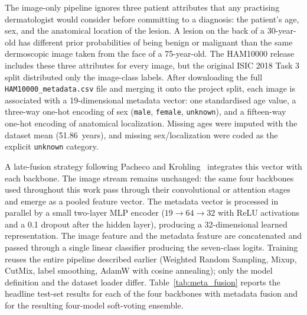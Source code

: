 The image-only pipeline ignores three patient attributes that any practising dermatologist would consider before committing to a diagnosis: the patient's age, sex, and the anatomical location of the lesion. A lesion on the back of a 30-year-old has different prior probabilities of being benign or malignant than the same dermoscopic image taken from the face of a 75-year-old. The HAM10000 release includes these three attributes for every image, but the original ISIC 2018 Task 3 split distributed only the image-class labels. After downloading the full \texttt{HAM10000\_metadata.csv} file and merging it onto the project split, each image is associated with a 19-dimensional metadata vector: one standardised age value, a three-way one-hot encoding of sex (\texttt{male}, \texttt{female}, \texttt{unknown}), and a fifteen-way one-hot encoding of anatomical localization. Missing ages were imputed with the dataset mean (51.86~years), and missing sex/localization were coded as the explicit \texttt{unknown} category.

A late-fusion strategy following Pacheco and Krohling~\cite{pacheco2020metadata} integrates this vector with each backbone. The image stream remains unchanged: the same four backbones used throughout this work pass through their convolutional or attention stages and emerge as a pooled feature vector. The metadata vector is processed in parallel by a small two-layer MLP encoder ($19 \rightarrow 64 \rightarrow 32$ with ReLU activations and a 0.1 dropout after the hidden layer), producing a 32-dimensional learned representation. The image feature and the metadata feature are concatenated and passed through a single linear classifier producing the seven-class logits. Training reuses the entire pipeline described earlier (Weighted Random Sampling, Mixup, CutMix, label smoothing, AdamW with cosine annealing); only the model definition and the dataset loader differ. Table~\ref{tab:meta_fusion} reports the headline test-set results for each of the four backbones with metadata fusion and for the resulting four-model soft-voting ensemble.

